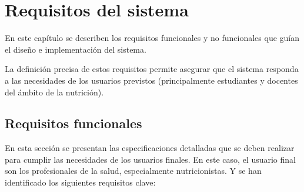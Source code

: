 \chapter{Requisitos del sistema}\label{capitulo3}
En este capítulo se describen los requisitos funcionales y no funcionales que guían el diseño e implementación del sistema. 

La definición precisa de estos requisitos permite asegurar que el sistema responda a las necesidades de los usuarios previstos (principalmente estudiantes y docentes del ámbito de la nutrición).

\section{Requisitos funcionales}
En esta sección se presentan las especificaciones detalladas que se deben realizar para cumplir las necesidades de los usuarios finales. En este caso, el usuario final son los profesionales de la salud, especialmente nutricionistas. Y se han identificado los siguientes requisitos clave:

